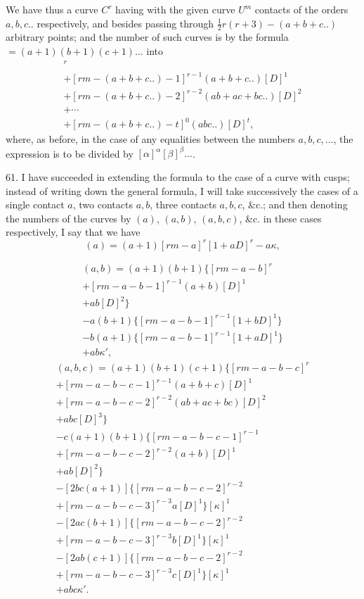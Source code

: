 \documentclass[12pt,a4paper]{article}
\begin{document}
We have thus a curve $C^r$ having with the given curve $U^m$ contacts of the orders $a, b, c..$ respectively, and besides passing through $\tfrac{1}{2}r(r+3) - (a+b+c..)$ arbitrary points; and the number of such curves is by the formula $= (a+1)(b+1)(c+1)\ldots$ into
\begin{multline*}
[rm - (a+b+c..)]^r \\
+ [rm - (a+b+c..) - 1]^{r-1} (a+b+c..) [D]^1 \\
+ [rm - (a+b+c..) - 2]^{r-2} (ab+ac+bc..) [D]^2 \\
+ \cdots \\
+ [rm - (a+b+c..) - t]^0 (abc..) [D]^t,
\end{multline*}
where, as before, in the case of any equalities between the numbers $a, b, c, \ldots$, the expression is to be divided by $[\alpha]^\alpha [\beta]^\beta \ldots$.

61. I have succeeded in extending the formula to the case of a curve with cusps; instead of writing down the general formula, I will take successively the cases of a single contact $a$, two contacts $a, b$, three contacts $a, b, c$, \&c.; and then denoting the numbers of the curves by $(a)$, $(a, b)$, $(a, b, c)$, \&c. in these cases respectively, I say that we have
\[
(a) = (a+1)[rm - a]^r [1 + aD]^r - a\kappa,
\]

\begin{multline*}
(a, b) = (a+1)(b+1)\bigl\{[rm - a - b]^r \\
+ [rm - a - b - 1]^{r-1}(a+b)[D]^1 \\
+ ab[D]^2\bigr\} \\
- a(b+1)\bigl\{[rm - a - b - 1]^{r-1}[1 + bD]^1\bigr\} \\
- b(a+1)\bigl\{[rm - a - b - 1]^{r-1}[1 + aD]^1\bigr\} \\
+ ab\kappa',
\end{multline*}
\begin{multline*}
(a, b, c) = (a+1)(b+1)(c+1)\bigl\{[rm - a - b - c]^r \\
+ [rm - a - b - c - 1]^{r-1}(a+b+c)[D]^1 \\
+ [rm - a - b - c - 2]^{r-2}(ab+ac+bc)[D]^2 \\
+ abc[D]^3\bigr\} \\
- c(a+1)(b+1)\bigl\{[rm - a - b - c - 1]^{r-1} \\
+ [rm - a - b - c - 2]^{r-2}(a+b)[D]^1 \\
+ ab[D]^2\bigr\} \\
- [2bc(a+1)]\bigl\{[rm - a - b - c - 2]^{r-2} \\
+ [rm - a - b - c - 3]^{r-3}a[D]^1\bigr\}[\kappa]^1 \\
- [2ac(b+1)]\bigl\{[rm - a - b - c - 2]^{r-2} \\
+ [rm - a - b - c - 3]^{r-3}b[D]^1\bigr\}[\kappa]^1 \\
- [2ab(c+1)]\bigl\{[rm - a - b - c - 2]^{r-2} \\
+ [rm - a - b - c - 3]^{r-3}c[D]^1\bigr\}[\kappa]^1 \\
+ abc\kappa'.
\end{multline*}
\end{document}
